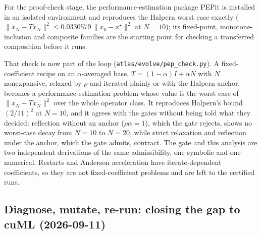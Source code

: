 For the proof-check stage, the performance-estimation package PEPit is
installed in an isolated environment and reproduces the Halpern worst case
exactly ($\|x_N - T x_N\|^2 \le 0.0330579\,\|x_0 - x^\star\|^2$ at $N = 10$); its
fixed-point, monotone-inclusion and composite families are the starting point
for checking a transferred composition before it runs.

That check is now part of the loop (\texttt{atlas/evolve/pep\_check.py}).
A fixed-coefficient recipe on an $\alpha$-averaged base, $T = (1-\alpha)I + \alpha N$
with $N$ nonexpansive, relaxed by $\rho$ and iterated plainly or with the
Halpern anchor, becomes a performance-estimation problem whose value is the
worst case of $\|x_N - T x_N\|^2$ over the whole operator class. It reproduces
Halpern's bound $(2/11)^2$ at $N=10$, and it agrees with the gates without being
told what they decided: reflection without an anchor ($\rho\alpha = 1$), which the
gate rejects, shows no worst-case decay from $N=10$ to $N=20$, while strict
relaxation and reflection under the anchor, which the gate admits, contract.
The gate and this analysis are two independent derivations of the same
admissibility, one symbolic and one numerical. Restarts and Anderson
acceleration have iterate-dependent coefficients, so they are not
fixed-coefficient problems and are left to the certified runs.

\subsection{Diagnose, mutate, re-run: closing the gap to cuML (2026-09-11)}
\label{app:log:diagnose}

